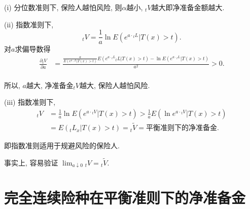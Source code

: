 \documentclass[lang=cn,10pt]{elegantbook}
\begin{document}
\begin{remark}
    (i) 分位数准则下, 保险人越怕风险, 则$\alpha$越小, ${}_tV$越大即净准备金额越大.
  
  (ii) 指数准则下, $${}_tV=\frac{1}{a}\ln E(e^{a\cdot{}_tL}|T(x)>t).$$
  对$a$求偏导数得
  \begin{align*}
      \frac{\partial {}_tV}{\partial a} &= \frac{\frac{a}{E(e^{a\cdot {}_tL}|T( x ) >t )}E( e^{a\cdot {}_tL}{}_tL|T( x ) >t )-\ln E( e^{a\cdot {}_tL}|T( x ) >t )}{a^2} >0. \\
  \end{align*}
  
  所以, $a$越大, 净准备金${}_tV$越大, 保险人越怕风险.
  
  (iii) 指数准则下,
  \begin{align*}
     {}_tV&=\frac{1}{a}\ln E(e^{a\cdot{}_tV}|T(x)>t)>\frac{1}{a}E(\ln e^{ a\cdot {}_tV}|T(x)>t)\\
     &=E(_tL_x|T(x)>t)={}_t\widetilde{V}=\text{平衡准则下的净准备金.}
  \end{align*}
  
  即指数准则适用于规避风险的保险人.
  
  事实上, 容易验证 $\lim_{a\downarrow 0}{}_tV={}_t\widetilde{V}.$
  \end{remark}

\section{完全连续险种在平衡准则下的净准备金}
\end{document}
